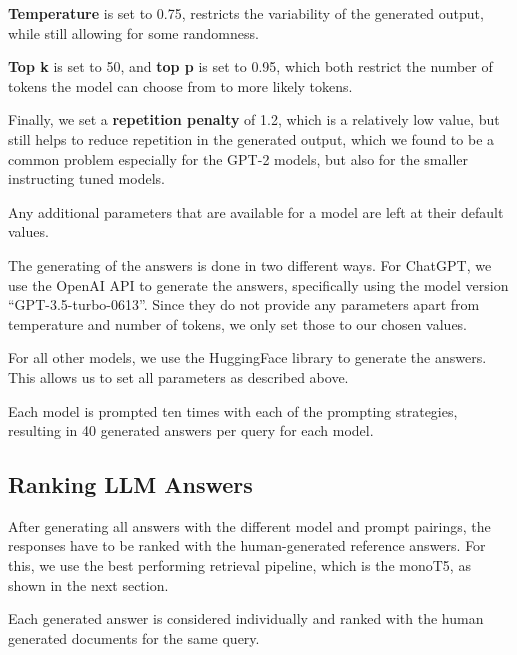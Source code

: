 \textbf{Temperature} is set to 0.75, restricts the variability of the generated output, while still allowing for some randomness.

\textbf{Top k} is set to 50, and \textbf{top p} is set to 0.95, which both restrict the number of tokens the model can choose from to more likely tokens.

Finally, we set a \textbf{repetition penalty} of 1.2, which is a relatively low value, but still helps to reduce repetition in the generated output, which we found to be a common problem especially for the GPT-2 models, but also for the smaller instructing tuned models.

Any additional parameters that are available for a model are left at their default values.


The generating of the answers is done in two different ways.
For ChatGPT, we use the OpenAI API to generate the answers, specifically using the model version ``GPT-3.5-turbo-0613''.
Since they do not provide any parameters apart from temperature and number of tokens, we only set those to our chosen values.

For all other models, we use the HuggingFace library to generate the answers.
This allows us to set all parameters as described above.

Each model is prompted ten times with each of the prompting strategies, resulting in 40 generated answers per query for each model.


\subsection{Ranking LLM Answers}
After generating all answers with the different model and prompt pairings, the responses have to be ranked with the human-generated reference answers.
For this, we use the best performing retrieval pipeline, which is the monoT5, as shown in the next section.

Each generated answer is considered individually and ranked with the human generated documents for the same query.